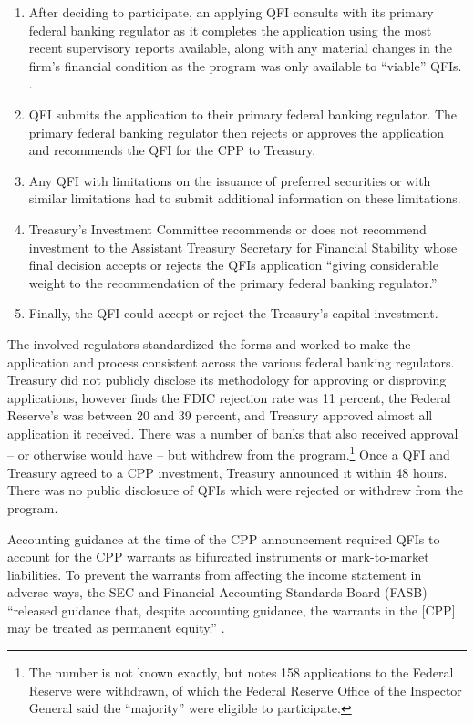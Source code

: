 \documentclass[12pt]{article}
\begin{document}
\begin{enumerate}
\item After deciding to participate, an applying QFI consults with its primary federal banking regulator as it completes the application using the most recent supervisory reports available, along with any material changes in the firm's financial condition as the program was only available to ``viable'' QFIs. \citep{CPPFaq}. 
\item QFI submits the application to their primary federal banking regulator. The primary federal banking regulator then rejects or approves the application and recommends the QFI for the CPP to Treasury. 
\item Any QFI with limitations on the issuance of preferred securities or with similar limitations had to submit additional information on these limitations. 
\item Treasury's Investment Committee recommends or does not recommend investment to the Assistant Treasury Secretary for Financial Stability whose final decision accepts or rejects the QFIs application ``giving considerable weight to the recommendation of the primary federal banking regulator.'' 
\item Finally, the QFI could accept or reject the Treasury's capital investment.
\end{enumerate}

The involved regulators standardized the forms and worked to make the application and process consistent across the various federal banking regulators. Treasury did not publicly disclose its methodology for approving or disproving applications, however \citet{RejectionRates} finds the FDIC rejection rate was 11 percent, the Federal Reserve's was between 20 and 39 percent, and Treasury approved almost all application it received. There was a number of banks that also received approval -- or otherwise would have -- but withdrew from the program.\footnote{The number is not known exactly, but \citet{RejectionRates} notes 158 applications to the Federal Reserve were withdrawn, of which the Federal Reserve Office of the Inspector General said the ``majority'' were eligible to participate.} Once a QFI and Treasury agreed to a CPP investment, Treasury announced it within 48 hours. There was no public disclosure of QFIs which were rejected or withdrew from the program. 

Accounting guidance at the time of the CPP announcement required QFIs to account for the CPP warrants as bifurcated instruments or mark-to-market liabilities. To prevent the warrants from affecting the income statement in adverse ways, the SEC and Financial Accounting Standards Board (FASB) ``released guidance that, despite accounting guidance, the warrants in the [CPP] may be treated as permanent equity.'' \citep{mofo}. 
\end{document}
